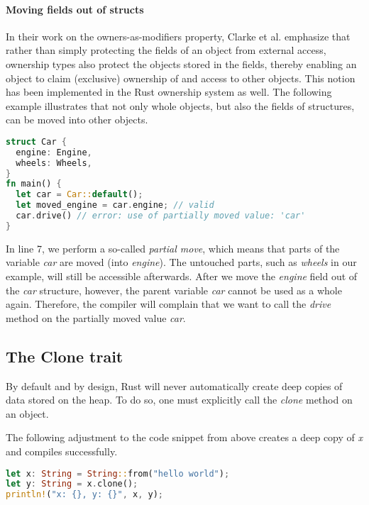 \documentclass[sigplan,11pt,nonacm]{acmart}
\begin{document}
\paragraph{Moving fields out of structs}

In their work on the owners-as-modifiers property, Clarke et al. \cite{ownership-types-survey} emphasize that rather than simply protecting the fields of an object from external access, ownership types also protect the objects stored in the fields, thereby enabling an object to claim (exclusive) ownership of and access to other objects.
This notion has been implemented in the Rust ownership system as well.
The following example illustrates that not only whole objects, but also the fields of structures, can be moved into other objects.

\begin{lstlisting}[language=Rust]
struct Car {
  engine: Engine,
  wheels: Wheels,
}
fn main() {
  let car = Car::default();
  let moved_engine = car.engine; // valid
  car.drive() // error: use of partially moved value: 'car'
}
\end{lstlisting}

In line 7, we perform a so-called \emph{partial move}, which means that parts of the variable \emph{car} are moved (into \emph{engine}).
The untouched parts, such as \emph{wheels} in our example, will still be accessible afterwards.
After we move the \emph{engine} field out of the \emph{car} structure, however, the parent variable \emph{car} cannot be used as a whole again.
Therefore, the compiler will complain that we want to call the \emph{drive} method on the partially moved value \emph{car}.


\subsection{The Clone trait}
\label{sec:rust-clone-trait}

By default and by design, Rust will never automatically create deep copies of data stored on the heap.
To do so, one must explicitly call the \emph{clone} method on an object.

The following adjustment to the code snippet from above creates a deep copy of \emph{x} and compiles successfully.
\begin{lstlisting}[language=Rust]
let x: String = String::from("hello world");
let y: String = x.clone();
println!("x: {}, y: {}", x, y);
\end{lstlisting}
\end{document}
